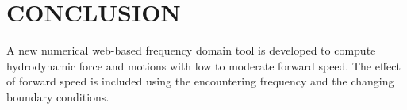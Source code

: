 \chapter{CONCLUSION}

A new numerical web-based frequency domain tool is developed to compute hydrodynamic force 
and motions with low to moderate forward speed. The effect of forward speed is included 
using the encountering frequency and the changing boundary conditions.